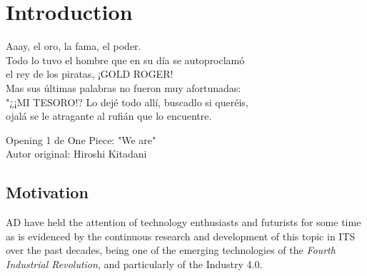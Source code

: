 % 
% 
% 
% 
% 
% 
% 

\chapter{Introduction}
\label{cha:introduction}

\begin{FraseCelebre}
  \begin{Frase}
    Aaay, el oro, la fama, el poder.  \\
    Todo lo tuvo el hombre que en su día se autoproclamó  \\
    el rey de los piratas, ¡GOLD ROGER!  \\
    Mas sus últimas palabras no fueron muy afortunadas:  \\
    "¿¡MI TESORO!? Lo dejé todo allí, buscadlo si queréis,  \\
    ojalá se le atragante al rufián que lo encuentre.
  \end{Frase}
  \begin{Fuente}
    Opening 1 de One Piece: "We are" \\
    Autor original: Hiroshi Kitadani
  \end{Fuente}
\end{FraseCelebre}

\section{Motivation}
\label{sec:1_motivation}

\ac{AD} have held the attention of technology enthusiasts and futurists for some time as is evidenced by the continuous research and development of this topic in \ac{ITS} over the past decades, being one of the emerging technologies of the \textit{Fourth Industrial Revolution}, and particularly of the Industry 4.0. \\

